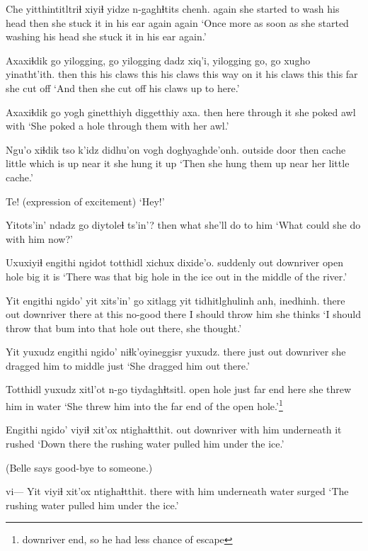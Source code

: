 \documentclass[12pt]{article}
\begin{document}
\gll Che yitthintitltriɬ xiyiɬ {yidze n-gaghɬtits} chenh.
again {she started to wash his head} then {she stuck it in his ear again} again
\glt `Once more as soon as she started washing his head she stuck it in his ear again.'
\glend

\gll Axaxiɬdik go yilogging, go yilogging dadz xiq'i, yilogging go, go xugho yinatht'ith.
then this {his claws} this {his claws} {this way} {on it} {his claws} this {} {this far} {she cut off}
\glt `And then she cut off his claws up to here.' 
\glend

\gll Axaxiɬdik go yogh ginetthiyh diggetthiy axa.
then here {through it} {she poked} awl with
\glt `She poked a hole through them with her awl.'
\glend

\gll Ngu'o xiɬdik tso k'idz didhu'on vogh doghyaghde'onh.
{outside door} then cache little {which is up} {near it} {she hung it up}
\glt `Then she hung them up near her little cache.'
\glend

\gll Te!
{(expression of excitement)}
\glt `Hey!'
\glend

\gll Yitots'in' {ndadz go} diytoleɬ ts'in'?
then what {she'll do to him} {}
\glt `What could she do with him now?'
\glend

\gll Uxuxiyiɬ engithi ngidot totthidl xichux dixide'o.
suddenly out downriver {open hole} big {it is}
\glt `There was that big hole in the ice out in the middle of the river.'
\glend

\gll Yit engithi ngido' yit xits'in' go xitlagg yit tidhitlghulinh anh, inedhinh.
there out {downriver} there at this no-good there {I should throw} him {she thinks}
\glt `I should throw that bum into that hole out there, she thought.'
\glend

\gll Yit yuxudz engithi ngido' niɬk'oyineggisr yuxudz.
there just out {downriver} {she dragged him to middle} just
\glt `She dragged him out there.'
\glend

\gll Totthidl yuxudz xitl'ot n-go tiydaghɬtsitl.
{open hole} just {far end} here {she threw him in water}
\glt `She threw him into the far end of the open hole.'\footnote{downriver end, so he had less chance of escape}
\glend

\gll Engithi ngido' viyiɬ xit'ox ntighaɬtthit.
out downriver {with him} underneath {it rushed}
\glt `Down there the rushing water pulled him under the ice.'
\glend

(Belle says good-bye to someone.)

\gll vi--- Yit viyiɬ xit'ox ntighaɬtthit.
{} there {with him} underneath {water surged}
\glt `The rushing water pulled him under the ice.'
\glend
\end{document}

